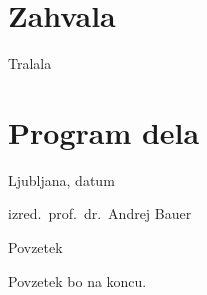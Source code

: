 \documentclass[11pt,a4paper,twoside,slovene]{book}
\begin{document}
\chapter*{Zahvala}
Tralala

\cleardoublepage

\pagestyle{fancyplain}

{
\renewcommand{\markboth}[2]{}
\tableofcontents
}

\cleardoublepage


%

\chapter*{Program dela}


\bigskip

\begin{flushleft}
  Ljubljana, datum %
\end{flushleft}

\bigskip

\begin{flushright}
  izred.\ prof.\ dr.\ Andrej Bauer %
  \quad 
\end{flushright}

\cleardoublepage
{}
{}

\thispagestyle{empty}
\begin{center}
{\Large \sc Povzetek}
\end{center}
Povzetek bo na koncu.
\end{document}
